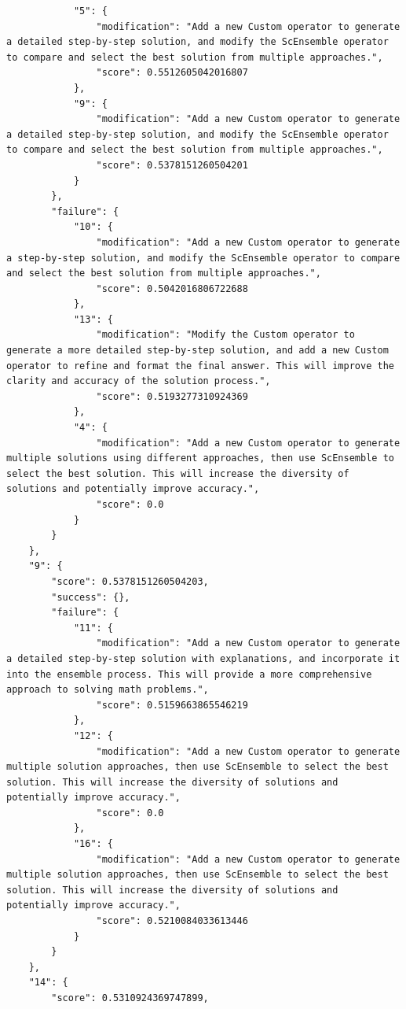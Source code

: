\documentclass{article} %
\theoremstyle{plain}
\theoremstyle{definition}
\theoremstyle{remark}
\begin{document}
\begin{tcolorbox}
\begin{verbatim}
            "5": {
                "modification": "Add a new Custom operator to generate a detailed step-by-step solution, and modify the ScEnsemble operator to compare and select the best solution from multiple approaches.",
                "score": 0.5512605042016807
            },
            "9": {
                "modification": "Add a new Custom operator to generate a detailed step-by-step solution, and modify the ScEnsemble operator to compare and select the best solution from multiple approaches.",
                "score": 0.5378151260504201
            }
        },
        "failure": {
            "10": {
                "modification": "Add a new Custom operator to generate a step-by-step solution, and modify the ScEnsemble operator to compare and select the best solution from multiple approaches.",
                "score": 0.5042016806722688
            },
            "13": {
                "modification": "Modify the Custom operator to generate a more detailed step-by-step solution, and add a new Custom operator to refine and format the final answer. This will improve the clarity and accuracy of the solution process.",
                "score": 0.5193277310924369
            },
            "4": {
                "modification": "Add a new Custom operator to generate multiple solutions using different approaches, then use ScEnsemble to select the best solution. This will increase the diversity of solutions and potentially improve accuracy.",
                "score": 0.0
            }
        }
    },
    "9": {
        "score": 0.5378151260504203,
        "success": {},
        "failure": {
            "11": {
                "modification": "Add a new Custom operator to generate a detailed step-by-step solution with explanations, and incorporate it into the ensemble process. This will provide a more comprehensive approach to solving math problems.",
                "score": 0.5159663865546219
            },
            "12": {
                "modification": "Add a new Custom operator to generate multiple solution approaches, then use ScEnsemble to select the best solution. This will increase the diversity of solutions and potentially improve accuracy.",
                "score": 0.0
            },
            "16": {
                "modification": "Add a new Custom operator to generate multiple solution approaches, then use ScEnsemble to select the best solution. This will increase the diversity of solutions and potentially improve accuracy.",
                "score": 0.5210084033613446
            }
        }
    },
    "14": {
        "score": 0.5310924369747899,

\end{verbatim}
\end{tcolorbox}
\end{document}
